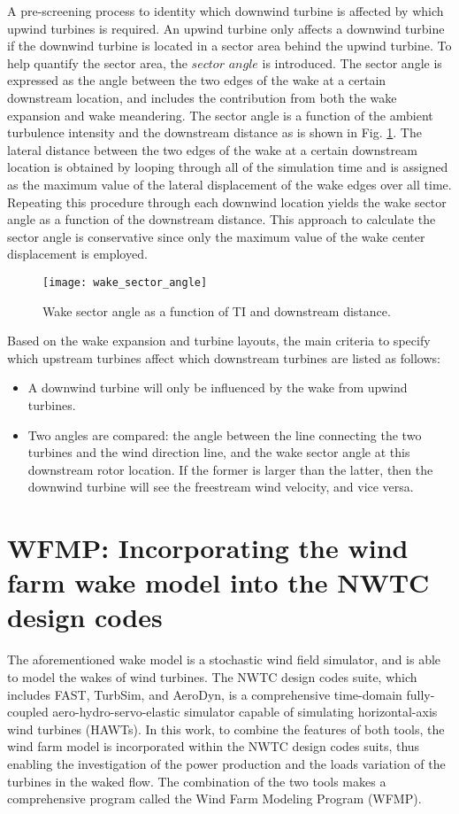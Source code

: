 \documentclass{umthesis}
\begin{document}
A pre-screening process to identity which downwind turbine is affected by which upwind turbines is required. An upwind turbine only affects a downwind turbine if the downwind turbine is located in a sector area behind the upwind turbine. To help quantify the sector area, the $sector$ $angle$ is introduced. The sector angle is expressed as the angle between the two edges of the wake at a certain downstream location, and includes the contribution from both the wake expansion and wake meandering. The sector angle is a function of the ambient turbulence intensity and the downstream distance as is shown in Fig. \ref{fig:sector angle}. The lateral distance between the two edges of the wake at a certain downstream location is obtained by looping through all of the simulation time and is assigned as the maximum value of the lateral displacement of the wake edges over all time. Repeating this procedure through each downwind location yields the wake sector angle as a function of the downstream distance. This approach to calculate the sector angle is conservative since only the maximum value of the wake center displacement is employed.

\begin{figure}
  \centering
  \texttt{[image: wake\_sector\_angle]}
  \caption{Wake sector angle as a function of TI and downstream distance.}\label{fig:sector angle}
\end{figure}

Based on the wake expansion and turbine layouts, the main criteria to specify which upstream turbines affect which downstream turbines are listed as follows:
\begin{itemize}
  \item A downwind turbine will only be influenced by the wake from upwind turbines.
  \item Two angles are compared: the angle between the line connecting the two turbines and the wind direction line, and the wake sector angle at this downstream rotor location. If the former is larger than the latter, then the downwind turbine will see the freestream wind velocity, and vice versa.
\end{itemize}


\chapter{WFMP: Incorporating the wind farm wake model into the NWTC design codes}\label{chap:DWM_NWTC}
The aforementioned wake model is a stochastic wind field simulator, and is able to model the wakes of wind turbines. The NWTC design codes suite, which includes FAST, TurbSim, and AeroDyn, is a comprehensive time-domain fully-coupled aero-hydro-servo-elastic simulator capable of simulating horizontal-axis wind turbines (HAWTs). In this work, to combine the features of both tools, the wind farm model is incorporated within the NWTC design codes suits, thus enabling the investigation of the power production and the loads variation of the turbines in the waked flow. The combination of the two tools makes a comprehensive program called the Wind Farm Modeling Program (WFMP).
\end{document}

